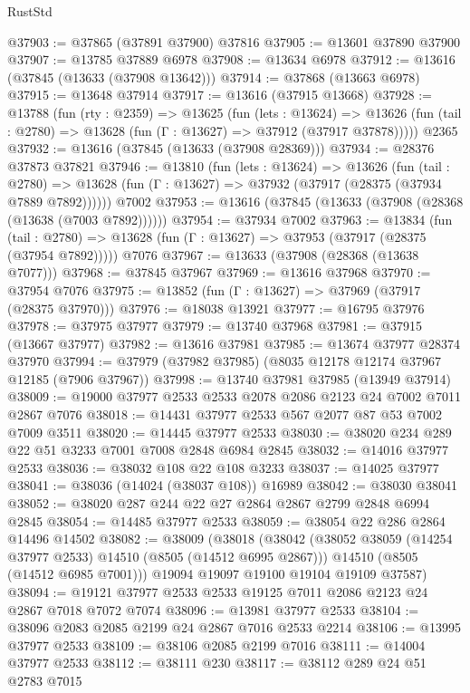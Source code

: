 \begin{lexlean}{RustStd}
\begin{coremodule}
@37903 := @37865 (@37891 @37900) @37816
@37905 := @13601 @37890 @37900
@37907 := @13785 @37889 @6978
@37908 := @13634 @6978
@37912 := @13616 (@37845 (@13633 (@37908 @13642)))
@37914 := @37868 (@13663 @6978)
@37915 := @13648 @37914
@37917 := @13616 (@37915 @13668)
@37928 := @13788
    (fun (rty : @2359) =>
    @13625
      (fun (lets : @13624) =>
      @13626 (fun (tail : @2780) => @13628 (fun (Γ : @13627) => @37912 (@37917 @37878)))))
    @2365
@37932 := @13616 (@37845 (@13633 (@37908 @28369)))
@37934 := @28376 @37873 @37821
@37946 := @13810
    (fun (lets : @13624) =>
    @13626
      (fun (tail : @2780) =>
      @13628 (fun (Γ : @13627) => @37932 (@37917 (@28375 (@37934 @7889 @7892))))))
    @7002
@37953 := @13616 (@37845 (@13633 (@37908 (@28368 (@13638 (@7003 @7892))))))
@37954 := @37934 @7002
@37963 := @13834
    (fun (tail : @2780) => @13628 (fun (Γ : @13627) => @37953 (@37917 (@28375 (@37954 @7892)))))
    @7076
@37967 := @13633 (@37908 (@28368 (@13638 @7077)))
@37968 := @37845 @37967
@37969 := @13616 @37968
@37970 := @37954 @7076
@37975 := @13852 (fun (Γ : @13627) => @37969 (@37917 (@28375 @37970)))
@37976 := @18038 @13921
@37977 := @16795 @37976
@37978 := @37975 @37977
@37979 := @13740 @37968
@37981 := @37915 (@13667 @37977)
@37982 := @13616 @37981
@37985 := @13674 @37977 @28374 @37970
@37994 := @37979 (@37982 @37985) (@8035 @12178 @12174 @37967 @12185 (@7906 @37967))
@37998 := @13740 @37981 @37985 (@13949 @37914)
@38009 := @19000 @37977 @2533 @2533 @2078 @2086 @2123 @24 @7002 @7011 @2867 @7076
@38018 := @14431 @37977 @2533 @567 @2077 @87 @53 @7002 @7009 @3511
@38020 := @14445 @37977 @2533
@38030 := @38020 @234 @289 @22 @51 @3233 @7001 @7008 @2848 @6984 @2845
@38032 := @14016 @37977 @2533
@38036 := @38032 @108 @22 @108 @3233
@38037 := @14025 @37977
@38041 := @38036 (@14024 (@38037 @108)) @16989
@38042 := @38030 @38041
@38052 := @38020 @287 @244 @22 @27 @2864 @2867 @2799 @2848 @6994 @2845
@38054 := @14485 @37977 @2533
@38059 := @38054 @22 @286 @2864 @14496 @14502
@38082 := @38009
    (@38018
      (@38042
        (@38052 @38059 (@14254 @37977 @2533) @14510 (@8505 (@14512 @6995 @2867)))
        @14510
        (@8505 (@14512 @6985 @7001)))
      @19094
      @19097
      @19100
      @19104
      @19109
      @37587)
@38094 := @19121 @37977 @2533 @2533 @19125 @7011 @2086 @2123 @24 @2867 @7018 @7072 @7074
@38096 := @13981 @37977 @2533
@38104 := @38096 @2083 @2085 @2199 @24 @2867 @7016 @2533 @2214
@38106 := @13995 @37977 @2533
@38109 := @38106 @2085 @2199 @7016
@38111 := @14004 @37977 @2533
@38112 := @38111 @230
@38117 := @38112 @289 @24 @51 @2783 @7015

\end{coremodule}
\end{lexlean}
